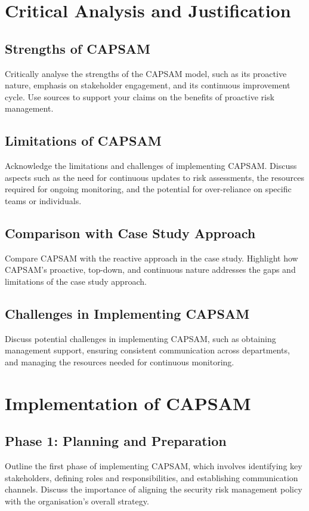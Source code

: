 \section{Critical Analysis and Justification}
    \subsection{Strengths of CAPSAM}
    Critically analyse the strengths of the CAPSAM model, such as its proactive nature, emphasis on stakeholder engagement, and its continuous improvement cycle. Use sources to support your claims on the benefits of proactive risk management.

    \subsection{Limitations of CAPSAM}
    Acknowledge the limitations and challenges of implementing CAPSAM. Discuss aspects such as the need for continuous updates to risk assessments, the resources required for ongoing monitoring, and the potential for over-reliance on specific teams or individuals.

    \subsection{Comparison with Case Study Approach}
    Compare CAPSAM with the reactive approach in the case study. Highlight how CAPSAM's proactive, top-down, and continuous nature addresses the gaps and limitations of the case study approach.

    \subsection{Challenges in Implementing CAPSAM}
    Discuss potential challenges in implementing CAPSAM, such as obtaining management support, ensuring consistent communication across departments, and managing the resources needed for continuous monitoring.

\section{Implementation of CAPSAM}
    \subsection{Phase 1: Planning and Preparation}
    Outline the first phase of implementing CAPSAM, which involves identifying key stakeholders, defining roles and responsibilities, and establishing communication channels. Discuss the importance of aligning the security risk management policy with the organisation's overall strategy.

